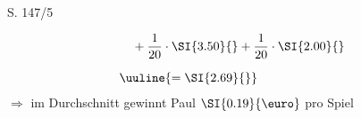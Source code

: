 \begin{Exercise}{S. 147/5}{}
\begin{enumerate}
\begin{enumerate}[label=\alph*),leftmargin=*]
{\begin{itemize}[leftmargin=*]
\begin{align*}
                        &\quad + \dfrac{1}{20} \cdot \SI{3.50}{} + \dfrac{1}{20} \cdot \SI{2.00}{} \\[1.5ex]
                        &\uuline{= \SI{2.69}{}}
                    \end{align*}
                    $\Rightarrow$ im Durchschnitt gewinnt Paul $\SI{0.19}{\text{\euro}}$ pro Spiel 
            \end{itemize}
        }
    \end{enumerate}
\end{enumerate}
\end{Exercise}